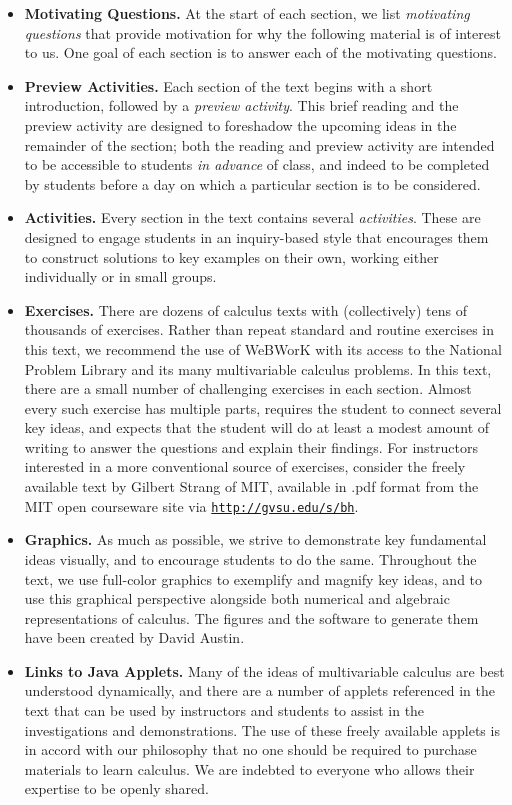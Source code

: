 \begin{itemize}
	\item {\bf Motivating Questions.}  At the start of each section, we list \emph{motivating questions} that provide motivation for why the following material is of interest to us.  One goal of each section is to answer each of the motivating questions.
	\item {\bf Preview Activities.} Each section of the text begins with a short introduction, followed by a \emph{preview activity}.  This brief reading and the preview activity are designed to foreshadow the upcoming ideas in the remainder of the section; both the reading and preview activity are intended to be accessible to students \emph{in advance} of class, and indeed to be completed by students before a day on which a particular section is to be considered.
	\item {\bf Activities.}  Every section in the text contains several \emph{activities}.  These are designed to engage students in an inquiry-based style that encourages them to construct solutions to key examples on their own, working either individually or in small groups.  
	\item {\bf Exercises.}  There are dozens of calculus texts with (collectively) tens of thousands of exercises.  Rather than repeat standard and routine exercises in this text, we recommend the use of WeBWorK with its access to the National Problem Library and its many multivariable calculus problems.  In this text, there are a small number of challenging exercises in each section.  Almost every such exercise has multiple parts, requires the student to connect several key ideas, and expects that the student will do at least a modest amount of writing to answer the questions and explain their findings.  For instructors interested in a more conventional source of exercises, consider the freely available text by Gilbert Strang of MIT, available in .pdf format from the MIT open courseware site via \href{http://gvsu.edu/s/bh}{\texttt{http://gvsu.edu/s/bh}}.
	\item {\bf Graphics.}  As much as possible, we strive to demonstrate key fundamental ideas visually, and to encourage students to do the same.  Throughout the text, we use full-color graphics to exemplify and magnify key ideas, and to use this graphical perspective alongside both numerical and algebraic representations of calculus.  The figures and the software to generate them have been created by David Austin.
	\item {\bf Links to Java Applets.}  Many of the ideas of multivariable calculus are best understood dynamically, and there are a number of applets referenced in the text that can be used by instructors and students to assist in the investigations and demonstrations. The use of these freely available applets is in accord with our philosophy that no one should be required to purchase materials to learn calculus. We are indebted to everyone who allows their expertise to be openly shared. 

\end{itemize}

